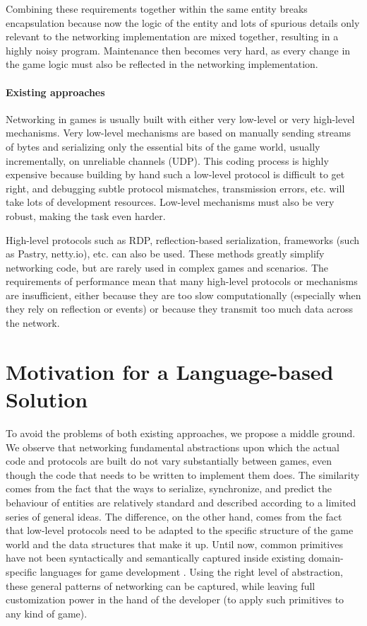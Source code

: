 Combining these requirements together within the same entity breaks encapsulation because now the logic of the entity and lots of spurious details only relevant to the networking implementation are mixed together, resulting in a highly noisy program. Maintenance then becomes very hard, as every change in the game logic must also be reflected in the networking implementation.

\paragraph{Existing approaches}
Networking in games is usually built with either very low-level or very high-level mechanisms. Very low-level mechanisms are based on manually sending streams of bytes and serializing only the essential bits of the game world, usually incrementally, on unreliable channels (UDP). This coding process is highly expensive because building by hand such a low-level protocol is difficult to get right, and debugging subtle protocol mismatches, transmission errors, etc. will take lots of development resources. Low-level mechanisms must also be very robust, making the task even harder.

High-level protocols such as RDP, reflection-based serialization, frameworks (such as Pastry, netty.io), etc. can also be used. These methods greatly simplify networking code, but are rarely used in complex games and scenarios. The requirements of performance mean that many high-level protocols or mechanisms are insufficient, either because they are too slow computationally (especially when they rely on reflection or events) or because they transmit too much data across the network.

\section{Motivation for a Language-based Solution}

To avoid the problems of both existing approaches, we propose a middle ground. We observe that networking fundamental abstractions upon which the actual code and protocols are built do not vary substantially between games, even though the code that needs to be written to implement them does. The similarity comes from the fact that the ways to serialize, synchronize, and predict the behaviour of entities are relatively standard and described according to a limited series of general ideas. The difference, on the other hand, comes from the fact that low-level protocols need to be adapted to the specific structure of the game world and the data structures that make it up. Until now, common primitives have not been syntactically and semantically captured inside existing domain-specific languages for game development \cite{bhatti2009domain}. Using the right level of abstraction, these general patterns of networking can be captured, while leaving full customization power in the hand of the developer (to apply such primitives to any kind of game).

